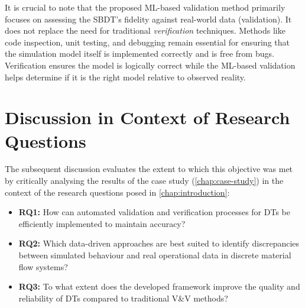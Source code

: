 It is crucial to note that the proposed ML-based validation method primarily focuses on assessing the SBDT's fidelity against real-world data (validation). It does not replace the need for traditional \textit{verification} techniques. Methods like code inspection, unit testing, and debugging remain essential for ensuring that the simulation model itself is implemented correctly and is free from bugs. Verification ensures the model is logically correct while the ML-based validation helps determine if it is the right model relative to observed reality.

\section{Discussion in Context of Research Questions}
\label{sec:discussion_rqs}
The subsequent discussion evaluates the extent to which this objective was met by critically analysing the results of the case study (\autoref{chap:case-study}) in the context of the research questions posed in \autoref{chap:introduction}:
\begin{itemize}
  \item \textbf{RQ1:} How can automated validation and verification processes for DTs be efficiently implemented to maintain accuracy?
  \item \textbf{RQ2:} Which data-driven approaches are best suited to identify discrepancies between simulated behaviour and real operational data in discrete material flow systems?
  \item \textbf{RQ3:} To what extent does the developed framework improve the quality and reliability of DTs compared to traditional V&V methods?
\end{itemize}

